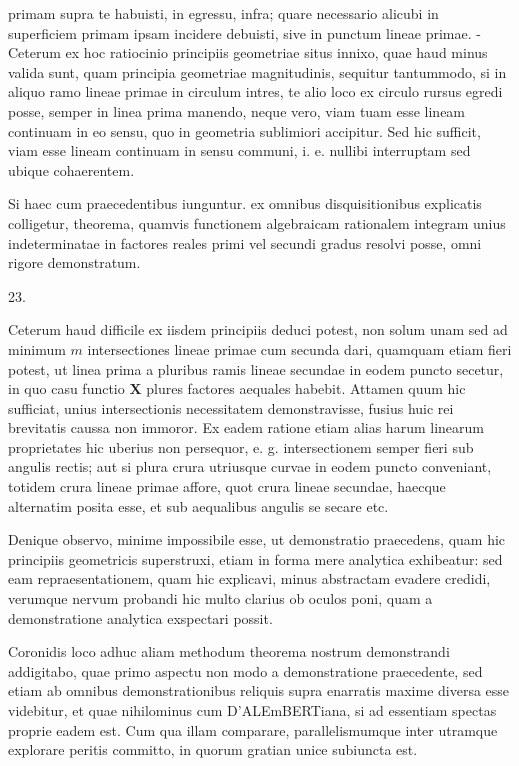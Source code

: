 \documentclass[twoside,12pt, showframe]{memoir}
\begin{document}
primam supra te habuisti, in egressu, infra; quare necessario alicubi in superficiem primam ipsam incidere debuisti, sive in punctum lineae primae. - Ceterum ex hoc ratiocinio principiis geometriae situs innixo, quae haud minus valida sunt, quam principia geometriae magnitudinis, sequitur tantummodo, si in aliquo ramo lineae primae in circulum intres, te alio loco ex circulo rursus egredi posse, semper in linea prima manendo, neque vero, viam tuam esse lineam continuam in eo sensu, quo in geometria sublimiori accipitur. Sed hic sufficit, viam esse lineam continuam in sensu communi, i. e. nullibi interruptam sed ubique cohaerentem.

Si haec cum praecedentibus iunguntur. ex omnibus disquisitionibus explicatis colligetur, theorema, quamvis functionem algebraicam rationalem integram unius indeterminatae in factores reales primi vel secundi gradus resolvi posse, omni rigore demonstratum.

23.

Ceterum haud difficile ex iisdem principiis deduci potest, non solum unam sed ad minimum \(m\) intersectiones lineae primae cum secunda dari, quamquam etiam fieri potest, ut linea prima a pluribus ramis lineae secundae in eodem puncto secetur, in quo casu functio \(\boldsymbol{X}\) plures factores aequales habebit. Attamen quum hic sufficiat, unius intersectionis necessitatem demonstravisse, fusius huic rei brevitatis caussa non immoror. Ex eadem ratione etiam alias harum linearum proprietates hic uberius non persequor, e. g. intersectionem semper fieri sub angulis rectis; aut si plura crura utriusque curvae in eodem puncto conveniant, totidem crura lineae primae affore, quot crura lineae secundae, haecque alternatim posita esse, et sub aequalibus angulis se secare etc.

Denique observo, minime impossibile esse, ut demonstratio praecedens, quam hic principiis geometricis superstruxi, etiam in forma mere analytica exhibeatur: sed eam repraesentationem, quam hic explicavi, minus abstractam evadere credidi, verumque nervum probandi hic multo clarius ob oculos poni, quam a demonstratione analytica exspectari possit.

Coronidis loco adhuc aliam methodum theorema nostrum demonstrandi addigitabo, quae primo aspectu non modo a demonstratione praecedente, sed etiam ab omnibus demonstrationibus reliquis supra enarratis maxime diversa esse videbitur, et quae nihilominus cum D'ALEmBERTiana, si ad essentiam spectas proprie eadem est. Cum qua illam comparare, parallelismumque inter utramque explorare peritis committo, in quorum gratian unice subiuncta est.
\end{document}
